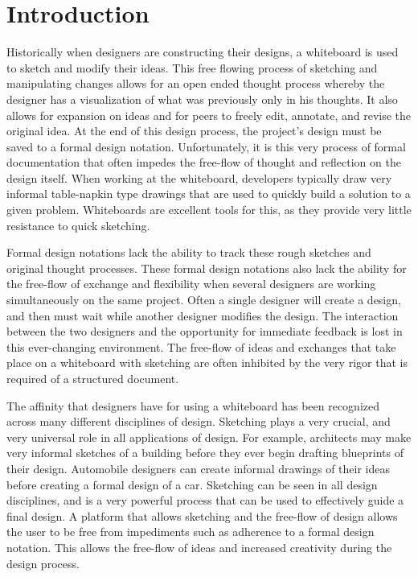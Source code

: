 \chapter{Introduction}


Historically when designers are constructing their designs, a whiteboard is used to sketch and modify their ideas.
This free flowing process of sketching and manipulating changes allows for an open ended thought process whereby the designer has a visualization of what was previously only in his thoughts. It also allows for expansion on ideas and for peers to freely edit, annotate, and revise the original idea. At the end of this design process, the project's design must be saved to a formal design notation. Unfortunately, it is this very process of formal documentation that often impedes the free-flow of thought and reflection on the design itself. When working at the whiteboard, developers typically draw very informal table-napkin type drawings that are used to quickly build a solution to a given problem. Whiteboards are excellent tools for this, as they provide very little resistance to quick sketching. 

Formal design notations lack the ability to track these rough sketches and original thought processes. These formal design notations also lack the ability for the free-flow of exchange and flexibility when several designers are working simultaneously on the same project. Often a single designer will create a design, and then must wait while another designer modifies the design. The interaction between the two designers and the opportunity for immediate feedback is lost in this ever-changing environment. The free-flow of ideas and exchanges that take place on a whiteboard with sketching are often inhibited by the very rigor that is required of a structured document.

The affinity that designers have for using a whiteboard has been recognized across many different disciplines of design. Sketching plays a very crucial, and very universal role in all applications of design. 
For example, architects may make very informal sketches of a building before they ever begin drafting blueprints of their design.
Automobile designers can create informal drawings of their ideas before creating a formal design of a car.
Sketching can be seen in all design disciplines, and is a very powerful process that can be used to effectively guide a final design.
A platform that allows sketching and the free-flow of design allows the user to be free from impediments such as adherence to a formal design notation. This allows the free-flow of ideas and increased creativity during the design process.

